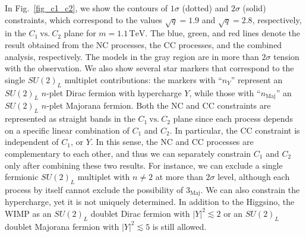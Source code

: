 \documentclass[12pt,twoside,book]{article}
\begin{document}
In Fig.~\ref{fig_c1_c2}, we show the contours of $1\sigma$ (dotted)
and $2\sigma$ (solid) constraints, which correspond to the values
$\sqrt{q}=1.9$ and $\sqrt{q}=2.8$, respectively, in the
$C_1~\mathrm{vs.}~C_2$ plane for $m=1.1\,\mathrm{TeV}$.  The blue,
green, and red lines denote the result obtained from the NC processes,
the CC processes, and the combined analysis, respectively.  The models
in the gray region are in more than $2\sigma$ tension with the
observation.  We also show several star markers that correspond to the
single $SU(2)_L$ multiplet contributions: the markers with ``$n_Y$''
represent an $SU(2)_L$ $n$-plet Dirac fermion with hypercharge $Y$,
while those with ``$n_\mathrm{Maj}$'' an $SU(2)_L$ $n$-plet Majorana
fermion.
Both the NC and CC constraints are represented
as straight bands in the $C_1~\mathrm{vs.}~C_2$ plane
since each process depends on a specific linear combination of $C_1$ and $C_2$.
In particular, the CC constraint is independent of $C_1$, or $Y$.
In this sense, the NC and CC processes are complementary to each other,
and thus we can separately constrain $C_1$ and $C_2$ only after
combining these two results.
For instance, we can exclude a single fermionic $SU(2)_L$ multiplet with $n \neq 2$ at more than
$2\sigma$ level, although
each process by itself cannot exclude the
possibility of $3_{\text{Maj}}$.
We can also constrain the hypercharge, yet it is not uniquely determined.
In addition to the Higgsino,
the WIMP as an $SU(2)_L$ doublet Dirac fermion with
$|Y|^2\lesssim 2$ or an $SU(2)_L$ doublet Majorana fermion with
$|Y|^2\lesssim 5$ is still allowed.
\end{document}
